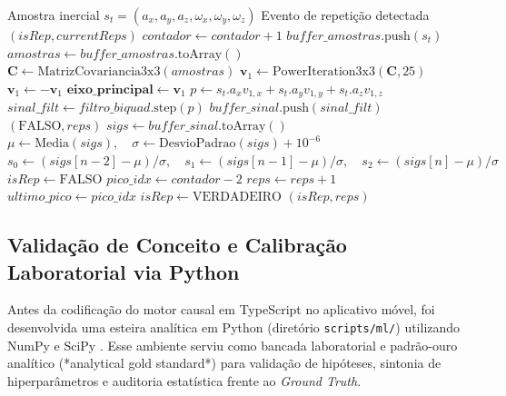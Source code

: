 \documentclass[12pt]{article}
\begin{document}
\begin{algorithm}[ht]
\caption{Processamento Amostra-a-Amostra do Motor GymBeat}
\label{alg:gymbeat}
\begin{algorithmic}[1]
\REQUIRE Amostra inercial $s_t = (a_x, a_y, a_z, \omega_x, \omega_y, \omega_z)$
\ENSURE Evento de repetição detectada $(isRep, currentReps)$
\STATE $contador \leftarrow contador + 1$
\STATE $buffer\_amostras.\text{push}(s_t)$
\STATE $amostras \leftarrow buffer\_amostras.\text{toArray}()$
    \STATE $\mathbf{C} \leftarrow \text{MatrizCovariancia3x3}(amostras)$
    \STATE $\mathbf{v}_1 \leftarrow \text{PowerIteration3x3}(\mathbf{C}, 25)$
        \STATE $\mathbf{v}_1 \leftarrow -\mathbf{v}_1$
    \ENDIF
    \STATE $\mathbf{eixo\_principal} \leftarrow \mathbf{v}_1$
\ENDIF
\STATE $p \leftarrow s_t.a_x v_{1,x} + s_t.a_y v_{1,y} + s_t.a_z v_{1,z}$
\STATE $sinal\_filt \leftarrow filtro\_biquad.\text{step}(p)$
\STATE $buffer\_sinal.\text{push}(sinal\_filt)$
    \RETURN $(\text{FALSO}, reps)$
\ENDIF
\STATE $sigs \leftarrow buffer\_sinal.\text{toArray}()$
\STATE $\mu \leftarrow \text{Media}(sigs), \quad \sigma \leftarrow \text{DesvioPadrao}(sigs) + 10^{-6}$
\STATE $s_0 \leftarrow (sigs[n-2] - \mu)/\sigma, \quad s_1 \leftarrow (sigs[n-1] - \mu)/\sigma, \quad s_2 \leftarrow (sigs[n] - \mu)/\sigma$
\STATE $isRep \leftarrow \text{FALSO}$
    \STATE $pico\_idx \leftarrow contador - 2$
        \STATE $reps \leftarrow reps + 1$
        \STATE $ultimo\_pico \leftarrow pico\_idx$
        \STATE $isRep \leftarrow \text{VERDADEIRO}$
    \ENDIF
\ENDIF
\RETURN $(isRep, reps)$
\end{algorithmic}
\end{algorithm}

\subsection{Validação de Conceito e Calibração Laboratorial via Python}

Antes da codificação do motor causal em TypeScript no aplicativo móvel, foi desenvolvida uma esteira analítica em Python (diretório \texttt{scripts/ml/}) utilizando NumPy \cite{harris2020} e SciPy \cite{virtanen2020}. Esse ambiente serviu como bancada laboratorial e padrão-ouro analítico (*analytical gold standard*) para validação de hipóteses, sintonia de hiperparâmetros e auditoria estatística frente ao \textit{Ground Truth}.
\end{document}
